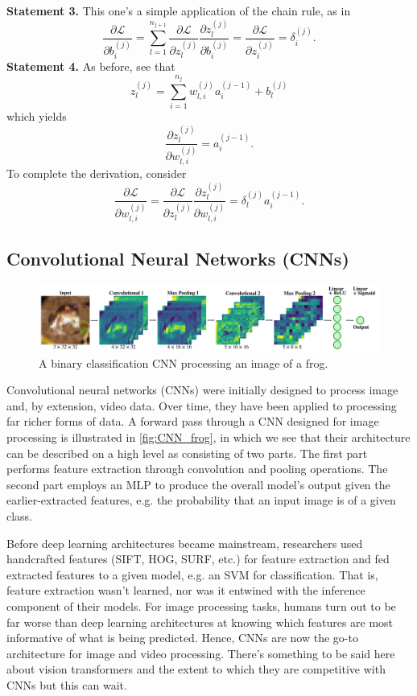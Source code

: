\documentclass[11pt]{article}
\begin{document}
\vspace{10pt}
\noindent\textbf{Statement 3.} This one's a simple application of the chain rule, as in
$$
\frac{\partial\mathcal{L}}{\partial b_i^{(j)}}
=
\sum_{l=1}^{n_{j+1}}\frac{\partial\mathcal{L}}{\partial z_l^{(j)}}\frac{\partial z_l^{(j)}}{\partial b_i^{(j)}}
=
\frac{\partial\mathcal{L}}{\partial z_i^{(j)}}
=
\delta_i^{(j)}.
$$
\textbf{Statement 4.} As before, see that
$$
z_l^{(j)}
=
\sum_{i=1}^{n_j}w_{l,i}^{(j)}a_i^{(j-1)}+b_l^{(j)}
$$
which yields
$$
\frac{\partial z_l^{(j)}}{\partial w_{l,i}^{(j)}}
=
a_i^{(j-1)}.
$$
To complete the derivation, consider
$$
\frac{\partial\mathcal{L}}{\partial w_{l,i}^{(j)}}
=
\frac{\partial\mathcal{L}}{\partial z_l^{(j)}}\frac{\partial z_l^{(j)}}{\partial w_{l,i}^{(j)}}
=
\delta_l^{(j)}a_i^{(j-1)}.
$$

\subsection{Convolutional Neural Networks (CNNs)}
\label{subsec:conv_neural_networks}

\begin{figure}[t]
    \centering
    \includegraphics[width=1\textwidth]{./figures/neural_nets/CNN_frog.pdf}
    \caption{A binary classification CNN processing an image of a frog.}
    \label{fig:CNN_frog}
\end{figure}

Convolutional neural networks (CNNs) were initially designed to process image and, by extension, video data. Over time, they have been applied to processing far richer forms of data. A forward pass through a CNN designed for image processing is illustrated in \autoref{fig:CNN_frog}, in which we see that their architecture can be described on a high level as consisting of two parts. The first part performs feature extraction through convolution and pooling operations. The second part employs an MLP to produce the overall model's output given the earlier-extracted features, e.g. the probability that an input image is of a given class.

Before deep learning architectures became mainstream, researchers used handcrafted features (SIFT, HOG, SURF, etc.) for feature extraction and fed extracted features to a given model, e.g. an SVM for classification. That is, feature extraction wasn't learned, nor was it entwined with the inference component of their models. For image processing tasks, humans turn out to be far worse than deep learning architectures at knowing which features are most informative of what is being predicted. Hence, CNNs are now the go-to architecture for image and video processing. There's something to be said here about vision transformers and the extent to which they are competitive with CNNs but this can wait.
\end{document}
